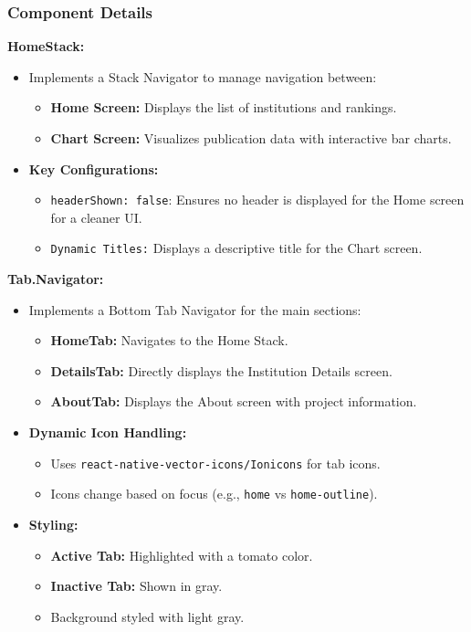 \documentclass[12pt]{article}
\begin{document}
\subsubsection*{Component Details}
\textbf{HomeStack:}
\begin{itemize}
    \item Implements a Stack Navigator to manage navigation between:
    \begin{itemize}
        \item \textbf{Home Screen:} Displays the list of institutions and rankings.
        \item \textbf{Chart Screen:} Visualizes publication data with interactive bar charts.
    \end{itemize}
    \item \textbf{Key Configurations:}
    \begin{itemize}
        \item \texttt{headerShown: false}: Ensures no header is displayed for the Home screen for a cleaner UI.
        \item \texttt{Dynamic Titles:} Displays a descriptive title for the Chart screen.
    \end{itemize}
\end{itemize}

\textbf{Tab.Navigator:}
\begin{itemize}
    \item Implements a Bottom Tab Navigator for the main sections:
    \begin{itemize}
        \item \textbf{HomeTab:} Navigates to the Home Stack.
        \item \textbf{DetailsTab:} Directly displays the Institution Details screen.
        \item \textbf{AboutTab:} Displays the About screen with project information.
    \end{itemize}
    \item \textbf{Dynamic Icon Handling:}
    \begin{itemize}
        \item Uses \texttt{react-native-vector-icons/Ionicons} for tab icons.
        \item Icons change based on focus (e.g., \texttt{home} vs \texttt{home-outline}).
    \end{itemize}
    \item \textbf{Styling:}
    \begin{itemize}
        \item \textbf{Active Tab:} Highlighted with a tomato color.
        \item \textbf{Inactive Tab:} Shown in gray.
        \item Background styled with light gray.
    \end{itemize}
\end{itemize}
\end{document}

